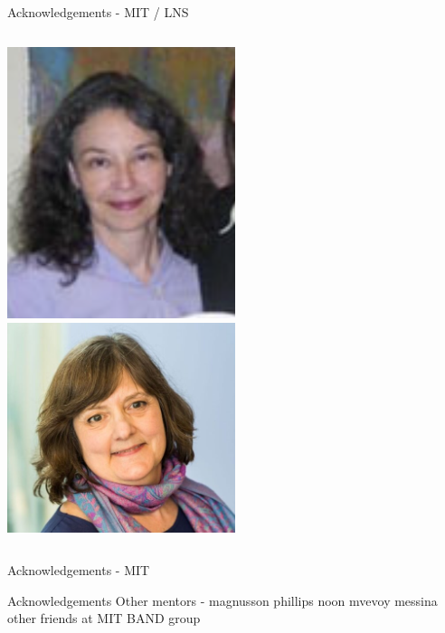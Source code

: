 \documentclass[aspectratio=169]{beamer}
\begin{document}
\begin{frame}{Acknowledgements - MIT / LNS}
\begin{columns}
        \centering
            
            \includegraphics[width=0.5\textwidth]{people/lns/cathy.png}
            \includegraphics[width=0.5\textwidth]{people/lns/sydney.png}
            
        \end{columns}   
\end{frame}

\begin{frame}{Acknowledgements - MIT}

\end{frame}


\begin{frame}{Acknowledgements}
Other mentors - magnusson phillips noon mvevoy messina
other friends at MIT  BAND group
\end{frame}
\end{document}
